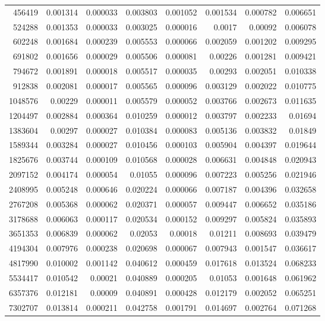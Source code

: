 \begin{tabular}{r r r r r r r r}
456419 & 0.001314 & 0.000033 & 0.003803 & 0.001052 & 0.001534 & 0.000782 & 0.006651 \\
524288 & 0.001353 & 0.000033 & 0.003025 & 0.000016 & 0.0017 & 0.00092 & 0.006078 \\
602248 & 0.001684 & 0.000239 & 0.005553 & 0.000066 & 0.002059 & 0.001202 & 0.009295 \\
691802 & 0.001656 & 0.000029 & 0.005506 & 0.000081 & 0.00226 & 0.001281 & 0.009421 \\
794672 & 0.001891 & 0.000018 & 0.005517 & 0.000035 & 0.00293 & 0.002051 & 0.010338 \\
912838 & 0.002081 & 0.000017 & 0.005565 & 0.000096 & 0.003129 & 0.002022 & 0.010775 \\
1048576 & 0.00229 & 0.000011 & 0.005579 & 0.000052 & 0.003766 & 0.002673 & 0.011635 \\
1204497 & 0.002884 & 0.000364 & 0.010259 & 0.000012 & 0.003797 & 0.002233 & 0.01694 \\
1383604 & 0.00297 & 0.000027 & 0.010384 & 0.000083 & 0.005136 & 0.003832 & 0.01849 \\
1589344 & 0.003284 & 0.000027 & 0.010456 & 0.000103 & 0.005904 & 0.004397 & 0.019644 \\
1825676 & 0.003744 & 0.000109 & 0.010568 & 0.000028 & 0.006631 & 0.004848 & 0.020943 \\
2097152 & 0.004174 & 0.000054 & 0.01055 & 0.000096 & 0.007223 & 0.005256 & 0.021946 \\
2408995 & 0.005248 & 0.000646 & 0.020224 & 0.000066 & 0.007187 & 0.004396 & 0.032658 \\
2767208 & 0.005368 & 0.000062 & 0.020371 & 0.000057 & 0.009447 & 0.006652 & 0.035186 \\
3178688 & 0.006063 & 0.000117 & 0.020534 & 0.000152 & 0.009297 & 0.005824 & 0.035893 \\
3651353 & 0.006839 & 0.000062 & 0.02053 & 0.00018 & 0.01211 & 0.008693 & 0.039479 \\
4194304 & 0.007976 & 0.000238 & 0.020698 & 0.000067 & 0.007943 & 0.001547 & 0.036617 \\
4817990 & 0.010002 & 0.001142 & 0.040612 & 0.000459 & 0.017618 & 0.013524 & 0.068233 \\
5534417 & 0.010542 & 0.00021 & 0.040889 & 0.000205 & 0.01053 & 0.001648 & 0.061962 \\
6357376 & 0.012181 & 0.00009 & 0.040891 & 0.000428 & 0.012179 & 0.002052 & 0.065251 \\
7302707 & 0.013814 & 0.000211 & 0.042758 & 0.001791 & 0.014697 & 0.002764 & 0.071268 \\

\end{tabular}
